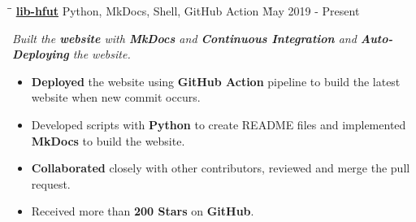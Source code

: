\documentclass{res}
\begin{document}
\begin{resume}
    \vspace{0.00in}
    \begin{tabbing}
    \hspace{2.391in}\= \hspace{3in}\= \kill %
    \href{https://github.com/lib-hfut/lib-hfut}{\bf lib-hfut}  \> 
                Python, MkDocs, Shell, GitHub Action \` May 2019 - Present \\
    \end{tabbing}\vspace{-20pt}      %
    \vspace{-0.1in}
    \textit{Built the {\bf website} with {\bf MkDocs} and {\bf Continuous Integration} and {\bf Auto-Deploying} the website.}
    \vspace{+0.05in}
    \begin{itemize} \itemsep 1.5pt %
        \item {\bf Deployed} the website using {\bf GitHub Action} pipeline to build the latest website 
                when new commit occurs.
        \item Developed scripts with {\bf Python} to create README files and implemented {\bf MkDocs} to build the website.
        \item {\bf Collaborated} closely with other contributors, reviewed and merge the pull request.
        \item Received more than {\bf 200 Stars} on {\bf GitHub}.
    \end{itemize}

\end{resume}
\end{document}
